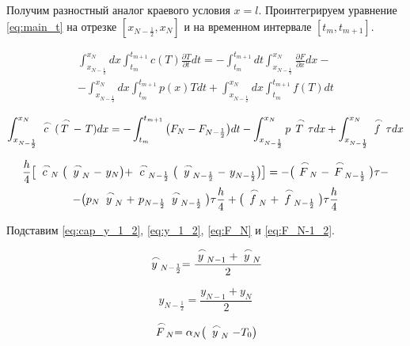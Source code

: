 Получим разностный аналог краевого условия $x=l$. Проинтегрируем уравнение \ref{eq:main_t} на отрезке $[x_{N-\frac{1}{2}}, x_N]$ и на временном интервале $[t_m, t_{m+1}]$.

\begin{multline*}
    \int_{x_{N-\frac{1}{2}}}^{x_N} dx \int_{t_m}^{t_{m+1}} c(T) \frac{\partial T}{\partial t} dt = - \int_{t_m}^{t_{m+1}} dt \int_{x_{N-\frac{1}{2}}}^{x_N} \frac{\partial F}{\partial x} dx - \\
    - \int_{x_{N-\frac{1}{2}}}^{x_N} dx \int_{t_m}^{t_{m+1}} p(x) T dt + \int_{x_{N-\frac{1}{2}}}^{x_N} dx \int_{t_m}^{t_{m+1}} f(T) dt
\end{multline*}

\begin{equation*}
    \int_{x_{N-\frac{1}{2}}}^{x_N} \LittleCap{c} (\LittleCap{T} -\ T) dx = - \int_{t_m}^{t_{m+1}} \big( F_N - F_{N - \frac{1}{2}} \big) dt - \int_{x_{N-\frac{1}{2}}}^{x_N} p \LittleCap{T} \tau dx + \int_{x_{N - \frac{1}{2}}}^{x_N} \LittleCap{f} \tau dx
\end{equation*}

\begin{multline*}
    \frac{h}{4} \big[ \LittleCap{c}_N \big( \LittleCap{y}_N -\ y_N \big) + \LittleCap{c}_{N-\frac{1}{2}} \big( \LittleCap{y}_{N-\frac{1}{2}} -\ y_{N-\frac{1}{2}} \big) \big] = - \big( \LittleCap{F}_N - \LittleCap{F}_{N-\frac{1}{2}} \big) \tau - \\
    - \big( p_N \LittleCap{y}_N +\ p_{N-\frac{1}{2}} \LittleCap{y}_{N-\frac{1}{2}} \big) \tau \frac{h}{4} + \big( \LittleCap{f}_N + \LittleCap{f}_{N-\frac{1}{2}} \big) \tau \frac{h}{4}
\end{multline*}

Подставим \ref{eq:cap_y_1_2}, \ref{eq:y_1_2}, \ref{eq:F_N} и \ref{eq:F_N-1_2}.

\begin{equation}\label{eq:cap_y_1_2}
    \LittleCap{y}_{N-\frac{1}{2}} = \frac{\LittleCap{y}_{N-1} + \LittleCap{y}_N}{2}
\end{equation}

\begin{equation}\label{eq:y_1_2}
    y_{N-\frac{1}{2}} = \frac{y_{N-1} + y_N}{2}
\end{equation}

\begin{equation}\label{eq:F_N}
    \LittleCap{F}_N = \alpha_N \big( \LittleCap{y}_N - T_0 \big)
\end{equation}

